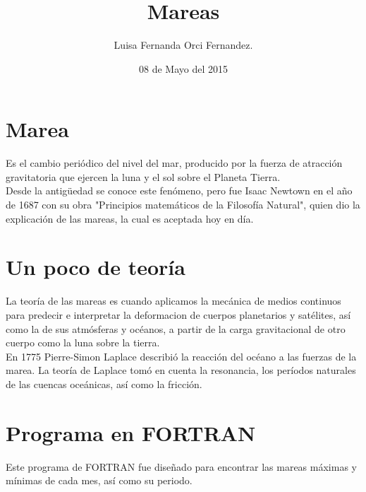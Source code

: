 \documentclass[10pt]{article}
\title{Mareas}
\author{Luisa Fernanda Orci Fernandez.}
\date{08 de Mayo del 2015}
\begin{document}
\maketitle

\section{Marea}
Es el cambio periódico del nivel del mar, producido por la fuerza de atracción gravitatoria que ejercen la luna y el sol sobre el Planeta Tierra. \\

Desde la antigüedad se conoce este fenómeno, pero fue Isaac Newtown en el año de 1687 con su obra "Principios matemáticos de la Filosofía Natural", quien dio la explicación de las mareas, la cual es aceptada hoy en día. 

\section{Un poco de teoría}
La teoría de las mareas es cuando aplicamos la mecánica de medios continuos para predecir e interpretar la deformacion de cuerpos planetarios y satélites, así como la de sus atmósferas y océanos, a partir de la carga gravitacional de otro cuerpo como la luna sobre la tierra. \\


En 1775 Pierre-Simon Laplace describió la reacción del océano a las fuerzas de la marea. La teoría de Laplace tomó en cuenta la resonancia, los períodos naturales de las cuencas oceánicas, así como la fricción. 

\newpage

\section{Programa en FORTRAN}


Este programa de FORTRAN fue diseñado para encontrar las  mareas máximas y mínimas de cada mes, así como su periodo.
\end{document}
